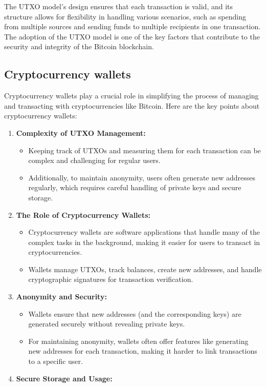 The UTXO model's design ensures that each transaction is valid, and its structure allows for flexibility in handling various scenarios, such as spending from multiple sources and sending funds to multiple recipients in one transaction. The adoption of the UTXO model is one of the key factors that contribute to the security and integrity of the Bitcoin blockchain.
\subsection{Cryptocurrency wallets}
Cryptocurrency wallets play a crucial role in simplifying the process of managing and transacting with cryptocurrencies like Bitcoin. Here are the key points about cryptocurrency wallets:\\
\begin{enumerate}
	\item \textbf{Complexity of UTXO Management:} 
	\begin{itemize}
		\item Keeping track of UTXOs and measuring them for each transaction can be complex and challenging for regular users.
		\item Additionally, to maintain anonymity, users often generate new addresses regularly, which requires careful handling of private keys and secure storage.
	\end{itemize}
	\item \textbf{The Role of Cryptocurrency Wallets:} 
	\begin{itemize}
		\item Cryptocurrency wallets are software applications that handle many of the complex tasks in the background, making it easier for users to transact in cryptocurrencies.
		\item Wallets manage UTXOs, track balances, create new addresses, and handle cryptographic signatures for transaction verification.
	\end{itemize}
	\item \textbf{Anonymity and Security:}
	\begin{itemize}
		\item Wallets ensure that new addresses (and the corresponding keys) are generated securely without revealing private keys.
		\item For maintaining anonymity, wallets often offer features like generating new addresses for each transaction, making it harder to link transactions to a specific user.
	\end{itemize}
	\item \textbf{Secure Storage and Usage:}

\end{enumerate}
